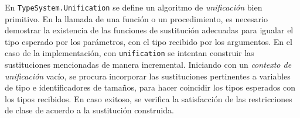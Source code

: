 En \lstinline[style = module]{TypeSystem.Unification} se define un algoritmo de \textit{unificación} bien primitivo.
En la llamada de una función o un procedimiento, es necesario demostrar la existencia de las funciones de sustitución adecuadas para igualar el tipo esperado por los parámetros, con el tipo recibido por los argumentos.
En el caso de la implementación, con \lstinline[style = haskell]{unification} se intentan construir las sustituciones mencionadas de manera incremental.
Iniciando con un \textit{contexto de unificación} vacío, se procura incorporar las sustituciones pertinentes a variables de tipo e identificadores de tamaños, para hacer coincidir los tipos esperados con los tipos recibidos.
En caso exitoso, se verifica la satisfacción de las restricciones de clase de acuerdo a la sustitución construida.